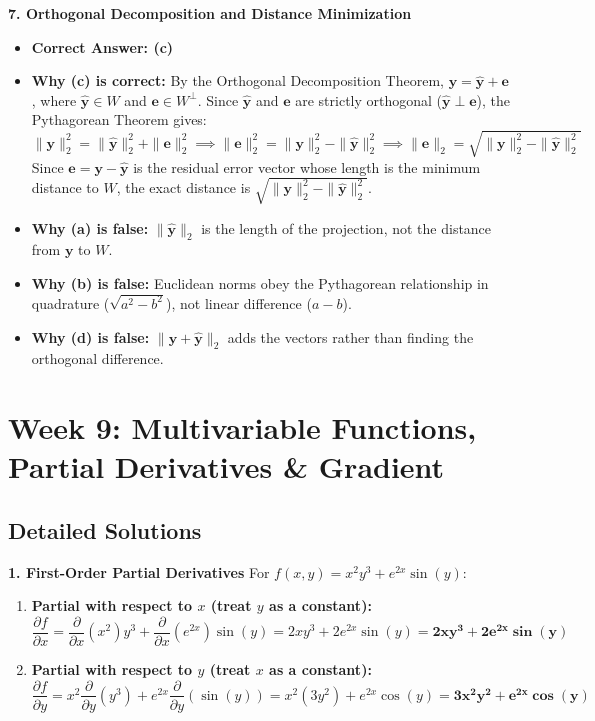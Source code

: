 \textbf{7. Orthogonal Decomposition and Distance Minimization}
\begin{itemize}
    \item \textbf{Correct Answer: (c)}
    \item \textbf{Why (c) is correct:} By the Orthogonal Decomposition Theorem, $\mathbf{y} = \hat{\mathbf{y}} + \mathbf{e}$, where $\hat{\mathbf{y}} \in W$ and $\mathbf{e} \in W^\perp$. Since $\hat{\mathbf{y}}$ and $\mathbf{e}$ are strictly orthogonal ($\hat{\mathbf{y}} \perp \mathbf{e}$), the Pythagorean Theorem gives:
    \begin{equation*}
    \|\mathbf{y}\|_2^2 = \|\hat{\mathbf{y}}\|_2^2 + \|\mathbf{e}\|_2^2 \implies \|\mathbf{e}\|_2^2 = \|\mathbf{y}\|_2^2 - \|\hat{\mathbf{y}}\|_2^2 \implies \|\mathbf{e}\|_2 = \sqrt{\|\mathbf{y}\|_2^2 - \|\hat{\mathbf{y}}\|_2^2}
    \end{equation*}
    Since $\mathbf{e} = \mathbf{y} - \hat{\mathbf{y}}$ is the residual error vector whose length is the minimum distance to $W$, the exact distance is $\sqrt{\|\mathbf{y}\|_2^2 - \|\hat{\mathbf{y}}\|_2^2}$.
    \item \textbf{Why (a) is false:} $\|\hat{\mathbf{y}}\|_2$ is the length of the projection, not the distance from $\mathbf{y}$ to $W$.
    \item \textbf{Why (b) is false:} Euclidean norms obey the Pythagorean relationship in quadrature ($\sqrt{a^2 - b^2}$), not linear difference ($a - b$).
    \item \textbf{Why (d) is false:} $\|\mathbf{y} + \hat{\mathbf{y}}\|_2$ adds the vectors rather than finding the orthogonal difference.
\end{itemize}

\section*{Week 9: Multivariable Functions, Partial Derivatives \& Gradient}

\subsection*{Detailed Solutions}

\textbf{1. First-Order Partial Derivatives}
For $f(x, y) = x^2 y^3 + e^{2x} \sin(y)$:
\begin{enumerate}
    \item \textbf{Partial with respect to $x$ (treat $y$ as a constant):}
    \begin{equation*}
    \frac{\partial f}{\partial x} = \frac{\partial}{\partial x}(x^2) y^3 + \frac{\partial}{\partial x}(e^{2x}) \sin(y) = 2x y^3 + 2 e^{2x} \sin(y) = \mathbf{2x y^3 + 2 e^{2x} \sin(y)}
    \end{equation*}
    \item \textbf{Partial with respect to $y$ (treat $x$ as a constant):}
    \begin{equation*}
    \frac{\partial f}{\partial y} = x^2 \frac{\partial}{\partial y}(y^3) + e^{2x} \frac{\partial}{\partial y}(\sin(y)) = x^2 (3y^2) + e^{2x} \cos(y) = \mathbf{3x^2 y^2 + e^{2x} \cos(y)}
    \end{equation*}
\end{enumerate}

